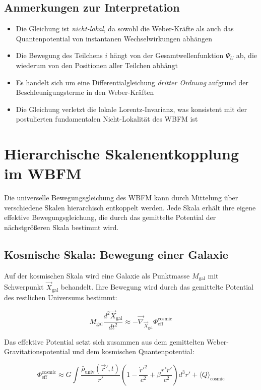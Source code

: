 \subsection*{Anmerkungen zur Interpretation}
\begin{itemize}
\item Die Gleichung ist \textit{nicht-lokal}, da sowohl die Weber-Kräfte als auch das Quantenpotential von instantanen Wechselwirkungen abhängen
\item Die Bewegung des Teilchens $i$ hängt von der Gesamtwellenfunktion $\Psi_U$ ab, die wiederum von den Positionen aller Teilchen abhängt
\item Es handelt sich um eine Differentialgleichung \textit{dritter Ordnung} aufgrund der Beschleunigungsterme in den Weber-Kräften
\item Die Gleichung verletzt die lokale Lorentz-Invarianz, was konsistent mit der postulierten fundamentalen Nicht-Lokalität des WBFM ist
\end{itemize}

\section{Hierarchische Skalenentkopplung im WBFM}

Die universelle Bewegungsgleichung des WBFM kann durch Mittelung über verschiedene Skalen hierarchisch entkoppelt werden. Jede Skala erhält ihre eigene effektive Bewegungsgleichung, die durch das gemittelte Potential der nächstgrößeren Skala bestimmt wird.

\subsection{Kosmische Skala: Bewegung einer Galaxie}

Auf der kosmischen Skala wird eine Galaxie als Punktmasse $M_{\text{gal}}$ mit Schwerpunkt $\vec{X}_{\text{gal}}$ behandelt. Ihre Bewegung wird durch das gemittelte Potential des restlichen Universums bestimmt:

\begin{equation}
M_{\text{gal}} \frac{d^2 \vec{X}_{\text{gal}}}{dt^2} \approx -\vec{\nabla}_{\vec{X}_{\text{gal}}} \Phi_{\text{eff}}^{\text{cosmic}}
\end{equation}

Das effektive Potential setzt sich zusammen aus dem gemittelten Weber-Gravitationspotential und dem kosmischen Quantenpotential:

\begin{equation}
\Phi_{\text{eff}}^{\text{cosmic}} \approx G \int \frac{\bar{\rho}_{\text{univ}}(\vec{r}', t)}{r'} \left(1 - \frac{\dot{r}'^2}{c^2} + \beta \frac{r' \ddot{r}'}{c^2}\right) d^3r' + \langle Q \rangle_{\text{cosmic}}
\end{equation}

